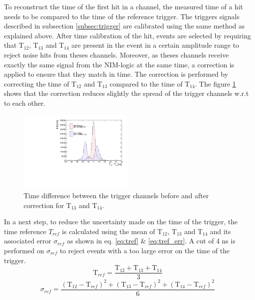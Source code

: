 \documentclass[twoside,a4paper,11pt]{article}
\begin{document}
To reconstruct the time of the first hit in a channel, the measured time of a hit needs to be compared to the time of the reference trigger. The triggers signals described in subsection \ref{subsec:trigger} are calibrated using the same method as explained above. After time calibration of the hit, events are selected by requiring that T$_{12}$, T$_{13}$ and T$_{14}$ are present in the event in a certain amplitude range to reject noise hits from theses channels. Moreover, as theses channels receive exactly the same signal from the NIM-logic at the same time, a correction is applied to ensure that they match in time. The correction is performed by correcting the time of T$_{12}$ and T$_{13}$ compared to the time of T$_{14}$. The figure \ref{fig:T0_Correction} shows that the correction reduces slightly the spread of the trigger channels w.r.t to each other.
\begin{figure}[htbp]
\begin{center}
\includegraphics[width=0.5\textwidth]{fig/T0s/T0_Resolution_6.pdf}
\caption{Time difference between the trigger channels before and after correction for T$_{13}$ and T$_{14}$.}
\label{fig:T0_Correction}
\end{center}
\end{figure}
In a next step, to reduce the uncertainty made on the time of the trigger, the time reference $T_{ref}$ is calculated using the mean of T$_{12}$, T$_{13}$ and T$_{14}$ and its associated error $\sigma_{ref}$ as shown in eq. \ref{eq:tref} \& \ref{eq:tref_err}. A cut of 4 ns is performed on $\sigma_{ref}$ to reject events with a too large error on the time of the trigger.
\begin{equation} \label{eq:tref}
\text{T}_{ref} = \frac{\text{T}_{12} + \text{T}_{13} + \text{T}_{14}}{3}
\end{equation}
\begin{equation} \label{eq:tref_err}
\sigma_{ref} = \frac{ (\text{T}_{12} - \text{T}_{ref})^2 + (\text{T}_{13} - \text{T}_{ref})^2  + (\text{T}_{14} - \text{T}_{ref})^2 }{6}
\end{equation}
\end{document}
